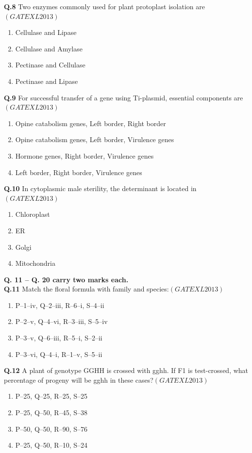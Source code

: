 \documentclass[12pt]{article}
\theoremstyle{remark}
\providecommand{\brak}[1]{\ensuremath{\left(#1\right)}}
\begin{document}
\textbf{Q.8} Two enzymes commonly used for plant protoplast isolation are\hfill  \textit{\brak{GATE XL 2013}}
\begin{enumerate}
    \item Cellulase and Lipase
    \item Cellulase and Amylase
    \item Pectinase and Cellulase
    \item Pectinase and Lipase
\end{enumerate}

\textbf{Q.9} For successful transfer of a gene using Ti-plasmid, essential components are\hfill  \textit{\brak{GATE XL 2013}}
\begin{enumerate}
    \item Opine catabolism genes, Left border, Right border
    \item Opine catabolism genes, Left border, Virulence genes
    \item Hormone genes, Right border, Virulence genes
    \item Left border, Right border, Virulence genes
\end{enumerate}

\textbf{Q.10} In cytoplasmic male sterility, the determinant is located in\hfill  \textit{\brak{GATE XL 2013}}
\begin{enumerate}
    \item Chloroplast
    \item ER
    \item Golgi
    \item Mitochondria
\end{enumerate}

\noindent\textbf{Q. 11 – Q. 20 carry two marks each.}\\

\textbf{Q.11} Match the floral formula with family and species:\hfill  \textit{\brak{GATE XL 2013}}
\begin{enumerate}
    \item P–1–iv, Q–2–iii, R–6–i, S–4–ii
    \item P–2–v, Q–4–vi, R–3–iii, S–5–iv
    \item P–3–v, Q–6–iii, R–5–i, S–2–ii
    \item P–3–vi, Q–4–i, R–1–v, S–5–ii
\end{enumerate}

\textbf{Q.12} A plant of genotype GGHH is crossed with gghh. If F1 is test-crossed, what percentage of progeny will be gghh in these cases?\hfill  \textit{\brak{GATE XL 2013}}
\begin{enumerate}
    \item P–25, Q–25, R–25, S–25
    \item P–25, Q–50, R–45, S–38
    \item P–50, Q–50, R–90, S–76
    \item P–25, Q–50, R–10, S–24
\end{enumerate}
\end{document}
